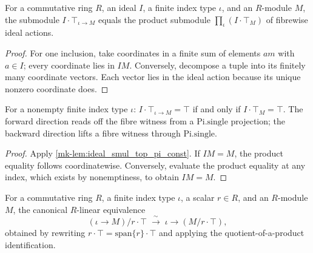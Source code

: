 \begin{lemma}\label{mk-lem:ideal_smul_top_pi_const}
  \leanok

  For a commutative ring \(R\), an ideal \(I\), a finite index type \(\iota\), and an
  \(R\)-module \(M\), the submodule \(I \cdot \top_{\iota \to M}\) equals the product
  submodule \(\prod_{\iota} (I \cdot \top_M)\) of fibrewise ideal actions.
\end{lemma}
\begin{proof}
  \leanok

For one inclusion, take coordinates in a finite sum of elements
  \(a m\) with \(a\in I\); every coordinate lies in \(IM\). Conversely,
  decompose a tuple into its finitely many coordinate vectors. Each vector
  lies in the ideal action because its unique nonzero coordinate does.
\end{proof}

\begin{lemma}\label{mk-lem:ideal_smul_top_pi_const_eq_top_iff}
  \leanok

  For a nonempty finite index type \(\iota\): \(I \cdot \top_{\iota \to M} = \top\) if
  and only if \(I \cdot \top_M = \top\). The forward direction reads off the fibre
  witness from a \(\text{Pi.single}\) projection; the backward direction lifts a
  fibre witness through \(\text{Pi.single}\).
\end{lemma}
\begin{proof}
  \leanok

Apply \ref{mk-lem:ideal_smul_top_pi_const}. If \(IM=M\), the product
  equality follows coordinatewise. Conversely, evaluate the product
  equality at any index, which exists by nonemptiness, to obtain \(IM=M\).
\end{proof}

\begin{definition}\label{mk-def:quotSMulTopPiConstLinearEquiv}
  \leanok

  For a commutative ring \(R\), a finite index type \(\iota\), a scalar \(r \in R\), and
  an \(R\)-module \(M\), the canonical \(R\)-linear equivalence
  \[
    (\iota \to M)\big/ r \cdot \top \;\xrightarrow{\ \sim\ }\; \iota \to (M / r \cdot \top),
  \]
  obtained by rewriting \(r \cdot \top = \text{span}\{r\} \cdot \top\) and applying the
  quotient-of-a-product identification.
\end{definition}

